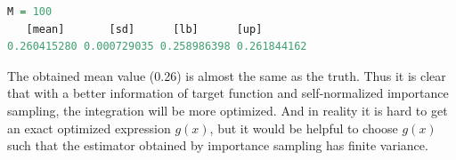 \documentclass[10pt, letterpaper]{proc}
\begin{document}
\begin{lstlisting}[language=R, breaklines=T, basicstyle=\footnotesize\ttfamily]
M = 100
   [mean]       [sd]      [lb]      [up]
0.260415280 0.000729035 0.258986398 0.261844162
\end{lstlisting}
The obtained mean value (0.26) is almost the same as the truth. Thus it is clear that with a better information of target function and self-normalized importance sampling, the integration will be more optimized. And in reality it is hard to get an exact optimized expression $g(x)$, but it would be helpful to choose $g(x)$ such that the estimator obtained by importance sampling has finite variance.
\end{document}
